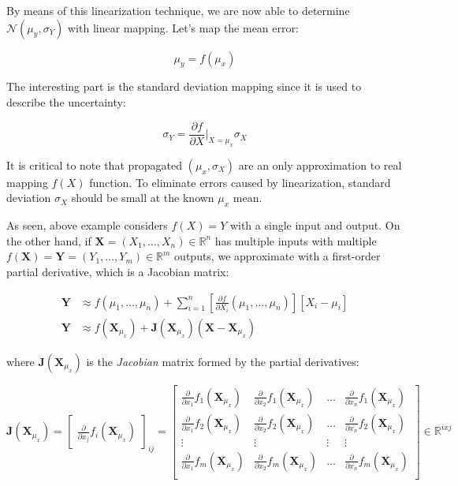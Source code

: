 \documentclass[12pt]{report}
\numberwithin{figure}{section}
\newcommand{\R}{\mathbb{R}}
\begin{document}
\begin{appendices}
By means of this linearization technique, we are now able to determine 
$\mathcal{N}(\mu_y, \sigma_Y)$ 
with linear mapping. Let's map the mean error:

\begin{equation}
  \mu_y = f(\mu_x)
\end{equation}

The interesting part is the standard deviation mapping since it 
is used to describe the uncertainty:

\begin{equation}
  \sigma_Y = \frac{\partial f}{\partial X}\bigg|_{X=\mu_x} \sigma_X
\end{equation}

It is critical to note that propagated $(\mu_x, \sigma_X)$ are an only 
approximation to real mapping $f(X)$ function. To eliminate errors 
caused by linearization, standard deviation $\sigma_X$ 
should be small at the known $\mu_x$ mean. 

As seen, above example considers $f(X)=Y$ with a single input and output. 
On the other hand, if $\mathbf{X}=(X_1,\dots,X_n) \in \R^n$ has multiple inputs with 
multiple $f(\mathbf{X})=\mathbf{Y}=(Y_1,\dots,Y_m) \in \R^m$ outputs,
we approximate with a first-order partial derivative, which is a Jacobian 
matrix:

\begin{equation}
  \begin{aligned}
    \mathbf{Y} & \approx f(\mu_1,\dots,\mu_n) + 
    \sum_{i=1}^{n} [\frac{\partial f}{\partial X_i}(\mu_1,\dots,\mu_n)][X_i-\mu_i] \\
    \mathbf{Y} & \approx f(\mathbf{X}_{\mu_x}) + \mathbf{J}(\mathbf{X}_{\mu_x}) (\mathbf{X} - \mathbf{X}_{\mu_x})
  \end{aligned}
\end{equation}

where $\mathbf{J}(\mathbf{X}_{\mu_x})$ is the \textit{Jacobian} matrix formed by 
the partial derivatives:

\begin{equation}
  \mathbf{J}(\mathbf{X}_{\mu_x}) = \begin{bmatrix} \frac{\partial}{\partial x_j }f_i(\mathbf{X}_{\mu_x}) \end{bmatrix}_{ij} 
  = 
  \begin{bmatrix} 
    \frac{\partial}{\partial x_1}f_1(\mathbf{X}_{\mu_x}) & \frac{\partial}{\partial x_2}f_1(\mathbf{X}_{\mu_x}) & \dots & \frac{\partial}{\partial x_n}f_1(\mathbf{X}_{\mu_x}) \\
    \frac{\partial}{\partial x_1}f_2(\mathbf{X}_{\mu_x}) & \frac{\partial}{\partial x_2}f_2(\mathbf{X}_{\mu_x}) & \dots & \frac{\partial}{\partial x_n}f_2(\mathbf{X}_{\mu_x}) \\
\vdots & \vdots & \vdots & \vdots \\
    \frac{\partial}{\partial x_1}f_m(\mathbf{X}_{\mu_x}) & \frac{\partial}{\partial x_2}f_m(\mathbf{X}_{\mu_x}) & \dots & \frac{\partial}{\partial x_n}f_m(\mathbf{X}_{\mu_x}) \\
  \end{bmatrix}
  \in \R^{ixj}
\end{equation}


\end{appendices}
\end{document}
